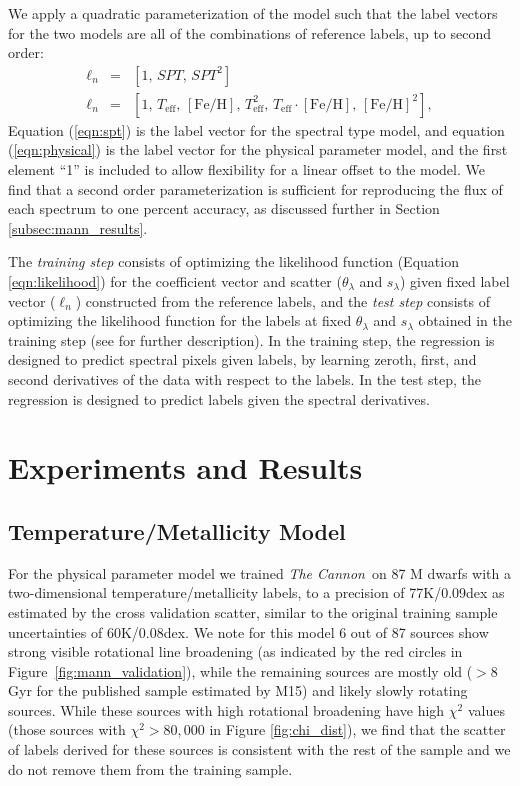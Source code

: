 \documentclass[modern]{aastex62}
\newcommand{\thecannon}{\textsl{The Cannon}}
\newcommand{\teff}{T_{\mathrm{eff}}}
\newcommand{\feh}{[{\mathrm{Fe}/\mathrm{H}}]}
\begin{document}
We apply a quadratic parameterization of the model such that the label vectors for the two models are all of the combinations of reference labels, up to second order:
\begin{eqnarray}
\ell_{n} &=& [1, \, SPT, \, SPT^{2}] \label{eqn:spt}
\\
\ell_{n} &=& [1, \, \teff, \, \feh, \, \teff^2, \, \teff \cdot \feh, \, \feh^{2}] \label{eqn:physical}
,
\end{eqnarray}
Equation (\ref{eqn:spt}) is the label vector for the spectral type model, and equation (\ref{eqn:physical}) is the label vector for the physical parameter model, and the first element ``1'' is included to allow flexibility for a linear offset to the model. We find that a second order parameterization is sufficient for reproducing the flux of each spectrum to one percent accuracy, as discussed further in Section \ref{subsec:mann_results}.

The \emph{training step} consists of optimizing the likelihood function (Equation \ref{eqn:likelihood}) for the coefficient vector and scatter ($\theta_{\lambda}$ and $s_{\lambda}$) given fixed label vector (\emph{$\ell_n$}) constructed from the reference labels, and the \emph{test step} consists of optimizing the likelihood function for the labels at fixed $\theta_{\lambda}$ and $s_{\lambda}$ obtained in the training step (see \citealt{Ness:2015} for further description). 
In the training step, the regression is designed to predict spectral pixels
given labels, by learning zeroth, first, and second derivatives of the data with respect to
the labels. In the test step, the regression is designed to predict labels given the spectral
derivatives.


\section{Experiments and Results} \label{sec:results}

\subsection{Temperature/Metallicity Model \label{subsec:mann_results}}

For the physical parameter model we trained \thecannon\ on 87 M dwarfs with a two-dimensional temperature/metallicity labels, to a precision of 77K/0.09dex as estimated by the cross validation scatter, similar to the original training sample uncertainties of 60K/0.08dex. We note for this model 6 out of 87 sources show strong visible rotational line broadening (as indicated by the red circles in Figure~\ref{fig:mann_validation}), while the remaining sources are mostly old ($>8$ Gyr for the published sample estimated by M15) and likely slowly rotating sources. While these sources with high rotational broadening have high $\chi^2$ values (those sources with $\chi^2 > 80,000$ in Figure \ref{fig:chi_dist}), we find that the scatter of labels derived for these sources is consistent with the rest of the sample and we do not remove them from the training sample.
\end{document}
